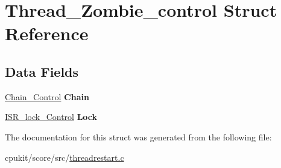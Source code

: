 \hypertarget{structThread__Zombie__control}{}\section{Thread\+\_\+\+Zombie\+\_\+control Struct Reference}
\label{structThread__Zombie__control}
\subsection*{Data Fields}
\begin{DoxyCompactItemize}
\item 
\mbox{\label{structThread__Zombie__control_aa84207101ad9daac0df520ab9f5269f8}} 
\mbox{\hyperlink{unionChain__Control}{Chain\+\_\+\+Control}} {\bfseries Chain}
\item 
\mbox{\label{structThread__Zombie__control_af96760a93331c6a34421a39e54afc1ae}} 
\mbox{\hyperlink{structISR__lock__Control}{I\+S\+R\+\_\+lock\+\_\+\+Control}} {\bfseries Lock}
\end{DoxyCompactItemize}


The documentation for this struct was generated from the following file\+:\begin{DoxyCompactItemize}
\item 
cpukit/score/src/\mbox{\hyperlink{threadrestart_8c}{threadrestart.\+c}}\end{DoxyCompactItemize}
